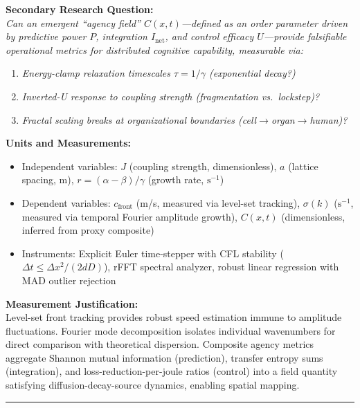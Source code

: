 \documentclass[
]{article}
\providecommand{\tightlist}{%
  \setlength{\itemsep}{0pt}\setlength{\parskip}{0pt}}
\begin{document}
\textbf{Secondary Research Question:}\\
\emph{Can an emergent ``agency field'' \(C(x,t)\)---defined as an order
parameter driven by predictive power \(P\), integration
\(I_{\text{net}}\), and control efficacy \(U\)---provide falsifiable
operational metrics for distributed cognitive capability, measurable
via:}

\begin{enumerate}
\def\labelenumi{\arabic{enumi}.}
\tightlist
\item
  \emph{Energy-clamp relaxation timescales \(\tau = 1/\gamma\)
  (exponential decay?)}
\item
  \emph{Inverted-U response to coupling strength (fragmentation
  vs.~lockstep)?}
\item
  \emph{Fractal scaling breaks at organizational boundaries
  (cell$\rightarrow$organ$\rightarrow$human)?}
\end{enumerate}

\textbf{Units and Measurements:}

\begin{itemize}
\tightlist
\item
  Independent variables: \(J\) (coupling strength, dimensionless), \(a\)
  (lattice spacing, m), \(r = (\alpha-\beta)/\gamma\) (growth rate,
  \(\mathrm{s}^{-1}\))
\item
  Dependent variables: \(c_{\text{front}}\) (m/s, measured via level-set
  tracking), \(\sigma(k)\) (\(\mathrm{s}^{-1}\), measured via temporal
  Fourier amplitude growth), \(C(x,t)\) (dimensionless, inferred from
  proxy composite)
\item
  Instruments: Explicit Euler time-stepper with CFL stability
  (\(\Delta t \le \Delta x^{2}/(2 d D)\)), rFFT spectral analyzer,
  robust linear regression with MAD outlier rejection
\end{itemize}

\textbf{Measurement Justification:}\\
Level-set front tracking provides robust speed estimation immune to
amplitude fluctuations. Fourier mode decomposition isolates individual
wavenumbers for direct comparison with theoretical dispersion. Composite
agency metrics aggregate Shannon mutual information (prediction),
transfer entropy sums (integration), and loss-reduction-per-joule ratios
(control) into a field quantity satisfying diffusion-decay-source
dynamics, enabling spatial mapping.

\begin{center}\rule{0.5\linewidth}{0.5pt}\end{center}
\end{document}
